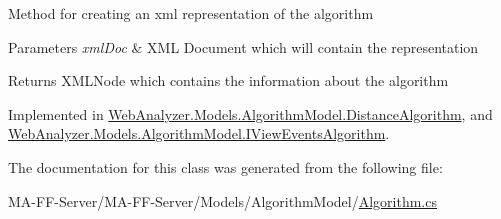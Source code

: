 Method for creating an xml representation of the algorithm 


\begin{DoxyParams}{Parameters}
{\em xml\+Doc} & X\+M\+L Document which will contain the representation\\
\hline
\end{DoxyParams}
\begin{DoxyReturn}{Returns}
X\+M\+L\+Node which contains the information about the algorithm
\end{DoxyReturn}


Implemented in \hyperlink{class_web_analyzer_1_1_models_1_1_algorithm_model_1_1_distance_algorithm_ad5882c45e12a53507c8c9ac86ad94776}{Web\+Analyzer.\+Models.\+Algorithm\+Model.\+Distance\+Algorithm}, and \hyperlink{class_web_analyzer_1_1_models_1_1_algorithm_model_1_1_i_view_events_algorithm_aaac2b9b4e6b08e6b6628155ca4f4da7e}{Web\+Analyzer.\+Models.\+Algorithm\+Model.\+I\+View\+Events\+Algorithm}.



The documentation for this class was generated from the following file\+:\begin{DoxyCompactItemize}
\item 
M\+A-\/\+F\+F-\/\+Server/\+M\+A-\/\+F\+F-\/\+Server/\+Models/\+Algorithm\+Model/\hyperlink{_algorithm_8cs}{Algorithm.\+cs}\end{DoxyCompactItemize}

